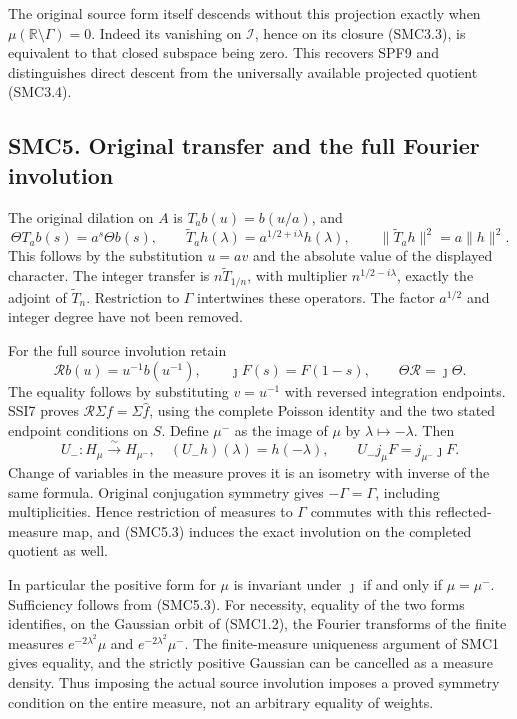 The original source form itself descends without this projection exactly
when \(\mu(\mathbb R\setminus\Gamma)=0\). Indeed its vanishing on
\(\mathcal I\), hence on its closure (SMC3.3), is equivalent to that
closed subspace being zero. This recovers SPF9 and distinguishes direct
descent from the universally available projected quotient (SMC3.4).

\subsection{SMC5. Original transfer and the full Fourier
involution}\label{smc5.-original-transfer-and-the-full-fourier-involution}

The original dilation on \(A\) is \(T_a b(u)=b(u/a)\), and \[
\Theta T_a b(s)=a^s\Theta b(s),\qquad
\widetilde T_a h(\lambda)=a^{1/2+i\lambda}h(\lambda),
\qquad\|\widetilde T_a h\|^2=a\|h\|^2.
\tag{SMC5.1}
\] This follows by the substitution \(u=av\) and the absolute value of
the displayed character. The integer transfer is
\(n\widetilde T_{1/n}\), with multiplier \(n^{1/2-i\lambda}\), exactly
the adjoint of \(\widetilde T_n\). Restriction to \(\Gamma\) intertwines
these operators. The factor \(a^{1/2}\) and integer degree have not been
removed.

For the full source involution retain \[
\mathcal R b(u)=u^{-1}b(u^{-1}),\qquad
\jmath F(s)=F(1-s),\qquad\Theta\mathcal R=\jmath\Theta.
\tag{SMC5.2}
\] The equality follows by substituting \(v=u^{-1}\) with reversed
integration endpoints. SSI7 proves
\(\mathcal R\Sigma f=\Sigma\widehat f\), using the complete Poisson
identity and the two stated endpoint conditions on \(S\). Define
\(\mu^-\) as the image of \(\mu\) by \(\lambda\mapsto-\lambda\). Then \[
U_-:H_\mu\xrightarrow{\sim}H_{\mu^-},\quad
(U_-h)(\lambda)=h(-\lambda),\qquad
U_-j_\mu F=j_{\mu^-}\jmath F.
\tag{SMC5.3}
\] Change of variables in the measure proves it is an isometry with
inverse of the same formula. Original conjugation symmetry gives
\(-\Gamma=\Gamma\), including multiplicities. Hence restriction of
measures to \(\Gamma\) commutes with this reflected-measure map, and
(SMC5.3) induces the exact involution on the completed quotient as well.

In particular the positive form for \(\mu\) is invariant under
\(\jmath\) if and only if \(\mu=\mu^-\). Sufficiency follows from
(SMC5.3). For necessity, equality of the two forms identifies, on the
Gaussian orbit of (SMC1.2), the Fourier transforms of the finite
measures \(e^{-2\lambda^2}\mu\) and \(e^{-2\lambda^2}\mu^-\). The
finite-measure uniqueness argument of SMC1 gives equality, and the
strictly positive Gaussian can be cancelled as a measure density. Thus
imposing the actual source involution imposes a proved symmetry
condition on the entire measure, not an arbitrary equality of weights.

